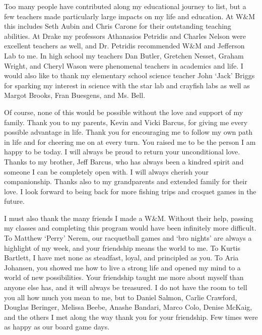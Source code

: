 \documentclass[../main.tex]{subfiles}
\begin{document}
\begin{singlespace}
{{\begin{flushleft}
Too many people have contributed along my educational journey to list, but a few teachers made particularly large impacts on my life and education. At W$\&$M this includes Seth Aubin and Chris Carone for their outstanding teaching abilities. At Drake my professors Athanasios Petridis and Charles Nelson were excellent teachers as well, and Dr. Petridis recommended W$\&$M and Jefferson Lab to me. In high school my teachers Dan Butler, Gretchen Nesset, Graham Wright, and Cheryl Wason were phenomenal teachers in academics and life. I would also like to thank my elementary school science teacher John `Jack' Briggs for sparking my interest in science with the star lab and crayfish labs as well as Margot Brooks, Fran Buesgens, and Ms. Bell. 

\end{flushleft}
} %

{\parindent0pt %
\begin{flushleft}
                                                                                 
Of course, none of this would be possible without the love and support of my family. Thank you to my parents, Kevin and Vicki Barcus, for giving me every possible advantage in life. Thank you for encouraging me to follow my own path in life and for cheering me on at every turn. You raised me to be the person I am happy to be today. I will always be proud to return your unconditional love. Thanks to my brother, Jeff Barcus, who has always been a kindred spirit and someone I can be completely open with. I will always cherish your companionship. Thanks also to my grandparents and extended family for their love. I look forward to being back for more fishing trips and croquet games in the future.

\end{flushleft}
} %

{\parindent0pt %
\begin{flushleft}
                                                                                 
I must also thank the many friends I made a W$\&$M. Without their help, passing my classes and completing this program would have been infinitely more difficult. To Matthew `Perry' Nerem, our racquetball games and `bro nights' are always a highlight of my week, and your friendship means the world to me. To Kurtis Bartlett, I have met none as steadfast, loyal, and principled as you. To Aria Johansen, you showed me how to live a strong life and opened my mind to a world of new possibilities. Your friendship taught me more about myself than anyone else has, and it will always be treasured. I do not have the room to tell you all how much you mean to me, but to Daniel Salmon, Carlie Crawford, Douglas Beringer, Melissa Beebe, Anashe Bandari, Marco Colo, Denise McKaig, and the others I met along the way thank you for your friendship. Few times were as happy as our board game days.


\end{flushleft}}}
\end{singlespace}
\end{document}
